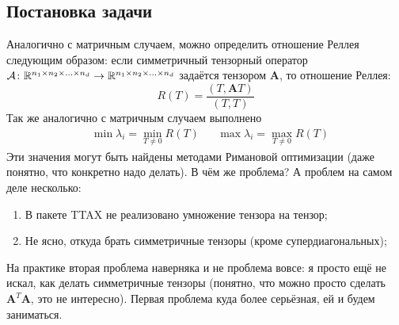 \documentclass[12pt]{article}
\newcommand{\mbf}{\mathbf}
\begin{document}
    \subsection*{Постановка задачи}
    Аналогично с матричным случаем, можно определить отношение Реллея следующим образом: если симметричный тензорный оператор
    $\mathcal{A} \colon\mathbb{R}^{n_1 \times n_2 \times \ldots \times n_d} \to \mathbb{R}^{n_1 \times n_2 \times \ldots \times n_d}$ задаётся тензором $\mbf{A}$,
    то отношение Реллея:
    \[
        R(T) = \frac{(T, \mbf{A}T)}{(T, T)}
    \]
    Так же аналогично с матричным случаем выполнено
    \begin{align*}
        &\min \lambda_i = \min_{T \neq 0} R(T)
        &&\max \lambda_i = \max_{T \neq 0} R(T)
    \end{align*}
    Эти значения могут быть найдены методами Римановой оптимизации (даже понятно, что конкретно надо делать). В чём же проблема? А проблем на самом деле
    несколько:
    \begin{enumerate}
        \item В пакете TTAX не реализовано умножение тензора на тензор;
        \item Не ясно, откуда брать симметричные тензоры (кроме супердиагональных);
    \end{enumerate}
    На практике вторая проблема наверняка и не проблема вовсе: я просто ещё не искал, как делать симметричные тензоры (понятно, что можно просто
    сделать $\mbf{A}^T\mbf{A}$, это не интересно). Первая проблема куда более серьёзная, ей и будем заниматься.
\end{document}

